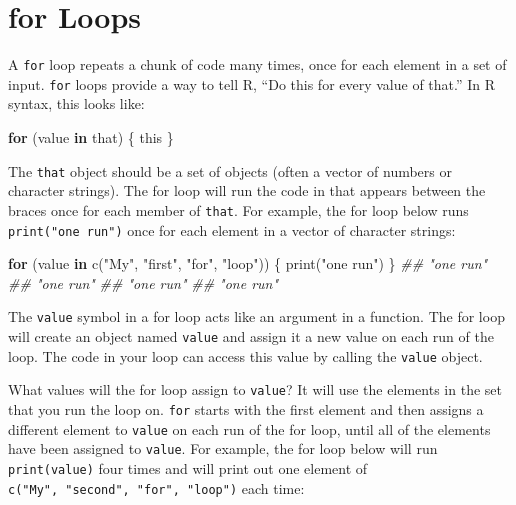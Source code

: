 \documentclass[
  letterpaper,
  DIV=11,
  numbers=noendperiod]{scrbook}
\newenvironment{Shaded}{\begin{snugshade}}{\end{snugshade}}
\newcommand{\ControlFlowTok}[1]{\textcolor[rgb]{0.00,0.23,0.31}{\textbf{#1}}}
\newcommand{\DocumentationTok}[1]{\textcolor[rgb]{0.37,0.37,0.37}{\textit{#1}}}
\newcommand{\FunctionTok}[1]{\textcolor[rgb]{0.28,0.35,0.67}{#1}}
\newcommand{\NormalTok}[1]{\textcolor[rgb]{0.00,0.23,0.31}{#1}}
\newcommand{\StringTok}[1]{\textcolor[rgb]{0.13,0.47,0.30}{#1}}
\begin{document}
\section{for Loops}\label{for-loops}

A \texttt{for} loop repeats a chunk of code many times, once for each
element in a set of input. \texttt{for} loops provide a way to tell R,
``Do this for every value of that.'' In R syntax, this looks like:

\begin{Shaded}
\begin{Highlighting}[]
\ControlFlowTok{for}\NormalTok{ (value }\ControlFlowTok{in}\NormalTok{ that) \{}
\NormalTok{  this}
\NormalTok{\}}
\end{Highlighting}
\end{Shaded}

The \texttt{that} object should be a set of objects (often a vector of
numbers or character strings). The for loop will run the code in that
appears between the braces once for each member of \texttt{that}. For
example, the for loop below runs \texttt{print("one\ run")} once for
each element in a vector of character strings:

\begin{Shaded}
\begin{Highlighting}[]
\ControlFlowTok{for}\NormalTok{ (value }\ControlFlowTok{in} \FunctionTok{c}\NormalTok{(}\StringTok{"My"}\NormalTok{, }\StringTok{"first"}\NormalTok{, }\StringTok{"for"}\NormalTok{, }\StringTok{"loop"}\NormalTok{)) \{}
  \FunctionTok{print}\NormalTok{(}\StringTok{"one run"}\NormalTok{)}
\NormalTok{\}}
\DocumentationTok{\#\# "one run"}
\DocumentationTok{\#\# "one run"}
\DocumentationTok{\#\# "one run"}
\DocumentationTok{\#\# "one run"}
\end{Highlighting}
\end{Shaded}

The \texttt{value} symbol in a for loop acts like an argument in a
function. The for loop will create an object named \texttt{value} and
assign it a new value on each run of the loop. The code in your loop can
access this value by calling the \texttt{value} object.

What values will the for loop assign to \texttt{value}? It will use the
elements in the set that you run the loop on. \texttt{for} starts with
the first element and then assigns a different element to \texttt{value}
on each run of the for loop, until all of the elements have been
assigned to \texttt{value}. For example, the for loop below will run
\texttt{print(value)} four times and will print out one element of
\texttt{c("My",\ "second",\ "for",\ "loop")} each time:
\end{document}
